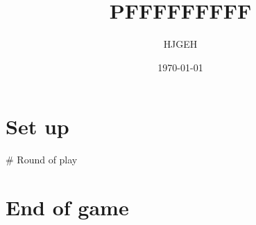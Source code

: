 \documentclass{article}%
\title{PFFFFFFFFF}%
\author{HJGEH}%
\date{\today}%
\begin{document}
%
\pagestyle{empty}%
\normalsize%
\maketitle%
\section{ Set up
}%
\label{sec:Setup}%
    \# Round of play


%
\section{ End of game}%
\label{sec:Endofgame}%

%
\end{document}
